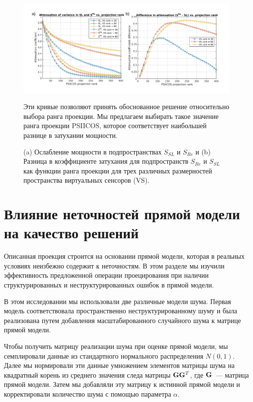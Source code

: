 \begin{figure}[htbp]
\includegraphics[width=\textwidth]{../images/psiicos_paper/Figure14_hr.jpg}
\caption{(a) Ослабление мощности в подпространствах $S_{SL}$ и $S_{Re}$ и (b)
    Разница в коэффициенте затухания для подпространств $S_{Re}$ и $S_{SL}$ как
    функции ранга проекции для трех различных размерностей пространства виртуальных
    сенсоров (VS).
}\label{fig:14}
    Эти кривые позволяют принять обоснованное решение
    относительно выбора ранга проекции.  Мы предлагаем выбирать такое значение ранга
    проекции PSIICOS, которое соответствует наибольшей разнице в затухании
    мощности.
\end{figure}

\section{Влияние неточностей прямой модели на качество решений}\label{sec:forward_model_errors_effect}

Описанная проекция строится на основании прямой модели, которая в реальных
условиях неизбежно содержит к неточностям.  В этом разделе мы изучили
эффективность предложенной операции проецирования при наличии структурированных
и неструктурированных ошибок в прямой модели.

В этом исследовании мы использовали две различные модели шума.  Первая модель
соответствовала пространственно неструктурированному шуму и была реализована
путем добавления масштабированного случайного шума к матрице прямой модели.

Чтобы получить матрицу реализации шума при оценке прямой модели, мы
семплировали данные из стандартного нормального распределения $N(0,1)$.  Далее
мы нормировали эти данные умножением элементов матрицы шума на квадратный корень
из среднего значения следа матрицы $\mathbf{G}\mathbf{G}^T$, где
$\mathbf{G}$~--- матрица прямой модели. Затем мы добавляли эту матрицу к
истинной прямой модели и корректировали количество шума с помощью
параметра $\alpha$.

